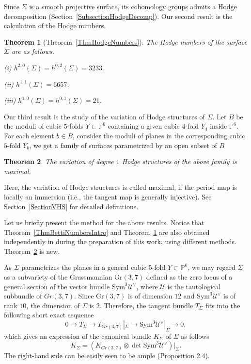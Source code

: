 \documentclass{article}
\newtheorem{theorem}{Theorem}[section]
\theoremstyle{definition}
\begin{document}
Since $\Sigma$ is a smooth projective surface, its cohomology groups admits a Hodge decomposition (Section~\ref{SubsectionHodgeDecomp}). Our second result is the calculation of the Hodge numbers.
\begin{theorem}[Theorem~\ref{ThmHodgeNumbers}]\label{ThmHodgeNumbersIntro}
    The Hodge numbers of the surface $\Sigma$ are as follows. 

(i) $h^{2, 0}(\Sigma) = h^{0, 2}(\Sigma) =3233.$

(ii) $h^{1, 1}(\Sigma) = 6657$.

(iii) $h^{1,0}(\Sigma)=h^{0, 1}(\Sigma)=21$.
\end{theorem}

Our third result is the study of the variation of Hodge structures of $\Sigma$. Let $B$ be the moduli of cubic $5$-folds $Y\subset \mathbb P^6$ containing a given cubic $4$-fold $Y_4$ inside $\mathbb P^6$. For each element $b\in B$, consider the moduli of planes in the corresponding cubic $5$-fold $Y_b$, we get a family of surfaces parametrized by an open subset of $B$

\begin{theorem}\label{ThmVHSisMaximal}
    The variation of degree $1$ Hodge structures of the above family is maximal. 
\end{theorem}

 Here, the variation of Hodge structures is called maximal, if the period map is locally an immersion (i.e., the tangent map is generally injective). See Section~\ref{SectionVHS} for detailed definitions.


Let us briefly present the method for the above results. Notice that Theorem~\ref{ThmBettiNumbersIntro} and Theorem~\ref{ThmHodgeNumbersIntro} are also obtained independently in \cite{Mboro} during the preparation of this work, using different methods. Theorem~\ref{ThmVHSisMaximal} is new.

As $\Sigma$ parametrizes the planes in a general cubic $5$-fold $Y\subset \mathbb P^6$, we may regard $\Sigma$ as a subvariety of the Grassmannian $\mathrm{Gr}(3, 7)$ defined as the zero locus of a general section of the vector bundle $\mathrm{Sym}^3\mathcal U^\vee$, where $\mathcal U$ is the tautological subbundle of $Gr(3, 7)$. Since $\mathrm{Gr}(3, 7)$ is of dimension $12$ and $\mathrm{Sym}^3\mathcal U^\vee$ is of rank $10$, the dimension of $\Sigma$ is $2$. Therefore, the tangent bundle $T_\Sigma$ fits into the following short exact sequence
\begin{equation}\label{EqExactSequenceForTangent}
    0 \to T_\Sigma\to T_{Gr(3, 7)}|_\Sigma \to \mathrm{Sym}^3\mathcal U^\vee|_\Sigma \to 0,
\end{equation}
which gives an expression of the canonical bundle $K_\Sigma$ of $\Sigma$ as follows
\[
K_\Sigma = (K_{Gr(3, 7)}\otimes \det \mathrm{Sym}^3\mathcal U^\vee)|_\Sigma.
\]
The right-hand side can be easily seen to be ample (Proposition 2.4).
\end{document}
